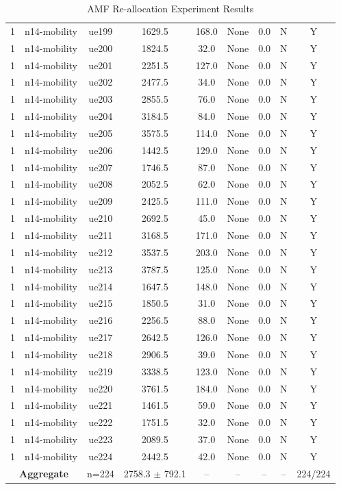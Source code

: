 \begin{table}[ht]
\begin{tabular}{|c|c|c|c|c|c|c|c|c|}
1 & n14-mobility & ue199 & 1629.5 & 168.0 & None & 0.0 & N & Y \\
1 & n14-mobility & ue200 & 1824.5 & 32.0 & None & 0.0 & N & Y \\
1 & n14-mobility & ue201 & 2251.5 & 127.0 & None & 0.0 & N & Y \\
1 & n14-mobility & ue202 & 2477.5 & 34.0 & None & 0.0 & N & Y \\
1 & n14-mobility & ue203 & 2855.5 & 76.0 & None & 0.0 & N & Y \\
1 & n14-mobility & ue204 & 3184.5 & 84.0 & None & 0.0 & N & Y \\
1 & n14-mobility & ue205 & 3575.5 & 114.0 & None & 0.0 & N & Y \\
1 & n14-mobility & ue206 & 1442.5 & 129.0 & None & 0.0 & N & Y \\
1 & n14-mobility & ue207 & 1746.5 & 87.0 & None & 0.0 & N & Y \\
1 & n14-mobility & ue208 & 2052.5 & 62.0 & None & 0.0 & N & Y \\
1 & n14-mobility & ue209 & 2425.5 & 111.0 & None & 0.0 & N & Y \\
1 & n14-mobility & ue210 & 2692.5 & 45.0 & None & 0.0 & N & Y \\
1 & n14-mobility & ue211 & 3168.5 & 171.0 & None & 0.0 & N & Y \\
1 & n14-mobility & ue212 & 3537.5 & 203.0 & None & 0.0 & N & Y \\
1 & n14-mobility & ue213 & 3787.5 & 125.0 & None & 0.0 & N & Y \\
1 & n14-mobility & ue214 & 1647.5 & 148.0 & None & 0.0 & N & Y \\
1 & n14-mobility & ue215 & 1850.5 & 31.0 & None & 0.0 & N & Y \\
1 & n14-mobility & ue216 & 2256.5 & 88.0 & None & 0.0 & N & Y \\
1 & n14-mobility & ue217 & 2642.5 & 126.0 & None & 0.0 & N & Y \\
1 & n14-mobility & ue218 & 2906.5 & 39.0 & None & 0.0 & N & Y \\
1 & n14-mobility & ue219 & 3338.5 & 123.0 & None & 0.0 & N & Y \\
1 & n14-mobility & ue220 & 3761.5 & 184.0 & None & 0.0 & N & Y \\
1 & n14-mobility & ue221 & 1461.5 & 59.0 & None & 0.0 & N & Y \\
1 & n14-mobility & ue222 & 1751.5 & 32.0 & None & 0.0 & N & Y \\
1 & n14-mobility & ue223 & 2089.5 & 37.0 & None & 0.0 & N & Y \\
1 & n14-mobility & ue224 & 2442.5 & 42.0 & None & 0.0 & N & Y \\
\multicolumn{2}{|c|}{\textbf{Aggregate}} & n=224 & 2758.3 $\pm$ 792.1 & -- & -- & -- & -- & 224/224 \\
\hline
\end{tabular}
\caption{AMF Re-allocation Experiment Results}
\label{tab:amf_realloc}
\end{table}
